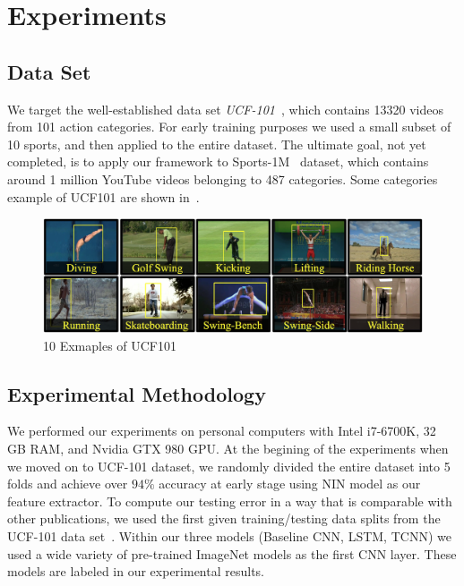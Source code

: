 \section{Experiments}
\subsection{Data Set}
We target the well-established data set \emph{UCF-101}~\cite{ucf101}, which contains 13320 videos from 101 action categories. For early training purposes we used a small subset of 10 sports, and then applied to the entire dataset. The ultimate goal, not yet completed, is to apply our framework to Sports-1M~\cite{cnnvid} dataset, which contains around 1 million YouTube videos belonging to 487 categories. Some categories example of UCF101 are shown in~.

\begin{figure}
  \centering
  \includegraphics[width=1.0\linewidth]{figs/ucf101.png}
  \caption{10 Exmaples of UCF101}
  \label{fig:ucf101}
\end{figure}



\subsection{Experimental Methodology}
We performed our experiments on personal computers with Intel i7-6700K, 32 GB RAM, and Nvidia GTX 980 GPU. At the begining of the experiments when we moved on to UCF-101 dataset, we randomly divided the entire dataset into 5 folds and achieve over $94\%$ accuracy at early stage using NIN model as our feature extractor. 
To compute our testing error in a way that is comparable with other publications, we used the first given training/testing data splits from the UCF-101 data set~\cite{ucf101}. Within our three models (Baseline CNN, LSTM, TCNN) we used a wide variety of pre-trained ImageNet models as the first CNN layer. These models are labeled in our experimental results. 

